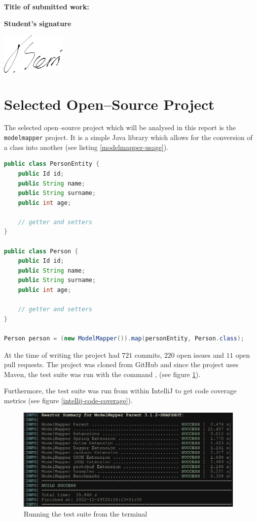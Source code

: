 \documentclass[12pt]{article}
\newcommand{\modelmapper}{\texttt{modelmapper}\xspace}
\DeclareRobustCommand{\ul}[1]{%
	\uline{\phantom{#1}}%
	\llap{\contour{white}{#1}}%
}
\begin{document}
\vspace{2cm}

\textbf{Title of submitted work:} \ul{CPS2002 Code Analysis}

\vspace{2cm}

\textbf{Student's signature} \medskip

\underline{\includegraphics[height=2cm]{images/sig.png}} \medskip

\section{Selected Open--Source Project}

The selected open--source project which will be analysed in this
report is the \modelmapper project. It is a simple Java library
which allows for the conversion of a class into another (see
listing \ref{modelmapper-usage}).

\begin{lstlisting}[language=Java, caption={Using the
\modelmapper library}, label={modelmapper-usage}]
public class PersonEntity {
    public Id id;
    public String name;
    public String surname;
    public int age;

    // getter and setters
}

public class Person {
    public Id id;
    public String name;
    public String surname;
    public int age;

    // getter and setters
}

Person person = (new ModelMapper()).map(personEntity, Person.class);
\end{lstlisting}

At the time of writing the project had $721$ commits, $220$ open
issues and $11$ open pull requests. The project was cloned from
GitHub and since the project uses Maven, the test suite was run
with the command , (see figure
\ref{running-test-suite}).

Furthermore, the test suite was run from within IntelliJ to get
code coverage metrics (see figure \ref{intellij-code-coverage}).

\begin{figure}[H]
    \centering
    \includegraphics[width=14cm]{images/test-suite.png}
    \caption{Running the test suite from the terminal}
    \label{running-test-suite}
\end{figure}
\end{document}
